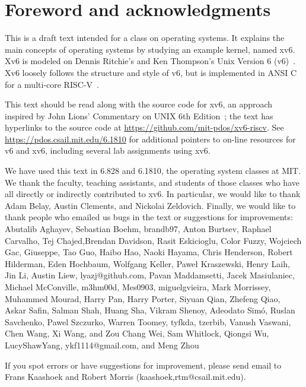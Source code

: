 \chapter*{Foreword and acknowledgments}


This is a draft text intended for a class on operating systems. It
explains the main concepts of operating systems by studying an example
kernel, named xv6.  Xv6 is modeled on Dennis Ritchie's and
Ken Thompson's Unix Version 6 (v6)~\cite{unix}.  Xv6 loosely follows the structure
and style of v6, but is implemented in ANSI C~\cite{kernighan} for 
a multi-core RISC-V~\cite{riscv}.

This text should be read along with the source code for xv6, an
approach inspired by John Lions' Commentary on UNIX 6th
Edition~\cite{lions}; the text has hyperlinks to the source code at
\url{https://github.com/mit-pdos/xv6-riscv}. See
\url{https://pdos.csail.mit.edu/6.1810} for additional pointers to
on-line resources for v6 and xv6, including several lab assignments
using xv6.

We have used this text in 6.828 and 6.1810, the operating system
classes at MIT.  We thank the faculty, teaching assistants, and
students of those classes who have all directly or indirectly
contributed to xv6.  In particular, we would like to thank Adam Belay,
Austin Clements, and Nickolai Zeldovich.  Finally, we would like to
thank people who emailed us bugs in the text or suggestions for
improvements: Abutalib Aghayev, Sebastian Boehm, brandb97, Anton
Burtsev, Raphael Carvalho, Tej Chajed,Brendan Davidson, Rasit
Eskicioglu, Color Fuzzy, Wojciech Gac, Giuseppe, Tao Guo, Haibo Hao,
Naoki Hayama, Chris Henderson, Robert Hilderman, Eden Hochbaum,
Wolfgang Keller, Paweł Kraszewski, Henry Laih, Jin Li, Austin Liew,
lyazj@github.com, Pavan Maddamsetti, Jacek Masiulaniec, Michael
McConville, m3hm00d, Mes0903, miguelgvieira, Mark Morrissey, Muhammed Mourad,
Harry Pan, Harry Porter, Siyuan Qian, Zhefeng Qiao, Askar Safin,
Salman Shah, Huang Sha, Vikram Shenoy, Adeodato Simó, Ruslan
Savchenko, Pawel Szczurko, Warren Toomey, tyfkda, tzerbib, Vanush
Vaswani, Chen Wang, Xi Wang, and Zou Chang Wei, Sam Whitlock, Qiongsi Wu,
LucyShawYang, ykf1114@gmail.com, and Meng Zhou

If you spot errors or have suggestions for improvement, please send email to
Frans Kaashoek and Robert Morris (kaashoek,rtm@csail.mit.edu).
